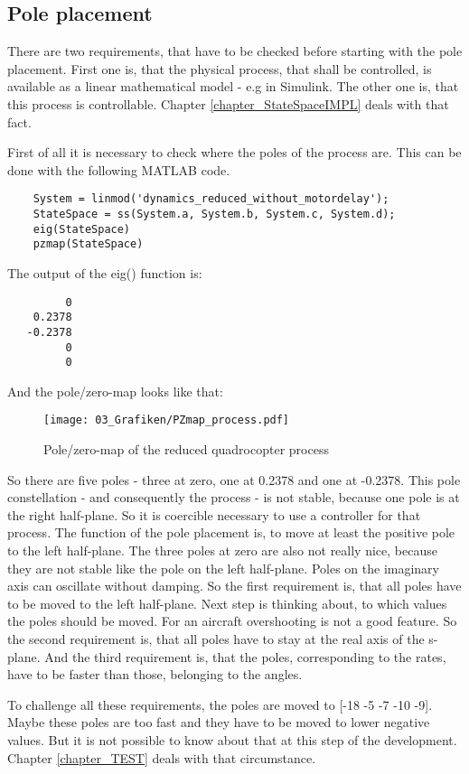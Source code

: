 \subsection{Pole placement}\label{chapter_PolePlacementIMPL}

There are two requirements, that have to be checked before starting with the pole placement. First one is, that the physical process, that shall be controlled, is available as a linear mathematical model - e.g in Simulink. The other one is, that this process is controllable. Chapter \ref{chapter_StateSpaceIMPL} deals with that fact. 

First of all it is necessary to check where the poles of the process are. This can be done with the following MATLAB code.

\begin{lstlisting}
	System = linmod('dynamics_reduced_without_motordelay');
	StateSpace = ss(System.a, System.b, System.c, System.d);
	eig(StateSpace) 
	pzmap(StateSpace)        
\end{lstlisting}

The output of the eig() function is:
\begin{lstlisting}
         0
    0.2378
   -0.2378
         0
         0       
\end{lstlisting}

And the pole/zero-map looks like that:
\begin{figure}
	\centering
		\texttt{[image: 03\_Grafiken/PZmap\_process.pdf]}
	\caption{Pole/zero-map of the reduced quadrocopter process}
	\label{fig:PZmap_process}
\end{figure}


So there are five poles - three at zero, one at 0.2378 and one at -0.2378. This pole constellation - and consequently the process - is not stable, because one pole is at the right half-plane. So it is coercible necessary to use a controller for that process. The function of the pole placement is, to move at least the positive pole to the left half-plane. The three poles at zero are also not really nice, because they are not stable like the pole on the left half-plane. Poles on the imaginary axis can oscillate without damping. So the first requirement is, that all poles have to be moved to the left half-plane.
Next step is thinking about, to which values the poles should be moved. For an aircraft overshooting is not a good feature. So the second requirement is, that all poles have to stay at the real axis of the s-plane. And the third requirement is, that the poles, corresponding to the rates, have to be faster than those, belonging to the angles. 

To challenge all these requirements, the poles are moved to [-18 -5 -7 -10 -9]. Maybe these poles are too fast and they have to be moved to lower negative values. But it is not possible to know about that at this step of the development. Chapter \ref{chapter_TEST} deals with that circumstance.